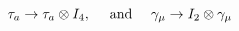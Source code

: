 \begin{equation}
\tau_a \rightarrow \tau_a \otimes I_4, ~~~~{\rm and} ~~~~\gamma_\mu \rightarrow I_2 \otimes \gamma_\mu  \nonumber
\end{equation}

